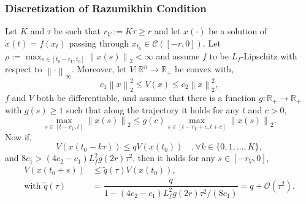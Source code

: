 \documentclass[11pt,aspectratio=169]{beamer}
\newcommand{\norm}[1]{\left\lVert#1\right\rVert}
\newcommand{\R}{\mathbb{R}}
\begin{document}
\begin{frame}[t]
    \frametitle{Discretization of Razumikhin Condition} 
Let $K$ and $\tau$ be such that $r_V:=K\tau\geq r$ and let $x(\cdot)$ be a solution of $\dot{x}(t)=f(x_t)$ passing through $x_{t_0}\in\mathcal{C}([-r,0])$. Let $\rho:=\max_{s\in[t_0-r_V,t_0]} \norm{x(s)}_2<\infty$ and assume $f$ to be $L_f$-Lipschitz with respect to $\norm{\cdot}_\infty$. Moreover, let $V:\R^n\to\R_+$ be convex with,
$$c_1 \norm{x}_2^2 \leq V(x) \leq c_2 \norm{x}_2^2,$$
$f$ and $V$ both be differentiable, and assume that there is a function $g:\R_+\to\R_+$ with $g(s)\geq 1$ such that along the trajectory it holds for any $t$ and $c>0$,
\begin{equation}
    \max_{s\in[t-r_V,t]} \norm{x(s)}_2 \leq g(c) \max_{s\in[t-r_V+c,t+c]}\norm{x(s)}_2.\label{eq:small_decay_cond}
\end{equation}
Now if,
\begin{equation}
    V(x(t_0-k\tau))\leq q V(x(t_0)) \quad,\forall k\in \lbrace 0,1,...,K \rbrace,\label{eq:DiscRazConProp}
\end{equation}
and $8c_1 > (4c_2-c_1)L_f^2 g(2r) \tau^2$, then it holds for any $s\in[-r_V,0]$,
\begin{align}
    V(x(t_0+s))&\leq \tilde{q}(\tau)V(x(t_0)),\label{eq:ContRazConProp}\\
    \text{with } \tilde{q}(\tau)&= \dfrac{q}{1-(4c_2-c_1)L_f^2g(2r)\tau^2/(8c_1)}=q+\mathcal{O}(\tau^2).\nonumber
\end{align}
\end{frame}


\end{document}
